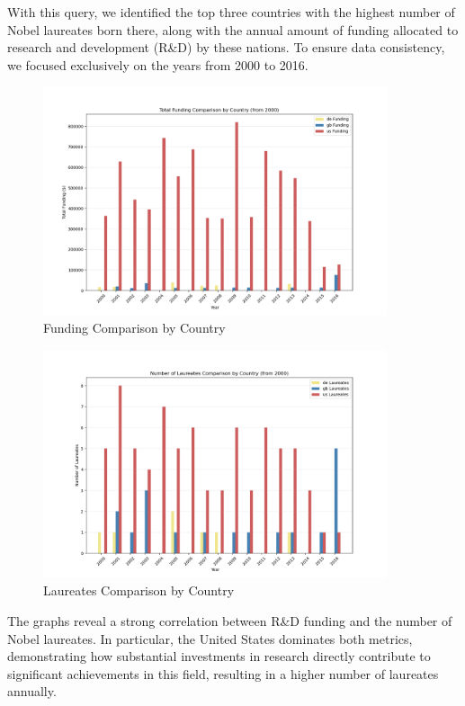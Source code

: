 \documentclass{article}
\begin{document}
\vspace{1em}

With this query, we identified the top three countries with the highest number of Nobel laureates born there, along with the annual amount of funding allocated to research and development (R\&D) by these nations. To ensure data consistency, we focused exclusively on the years from 2000 to 2016.

\begin{figure}[h!]
	\centering
	\includegraphics[width=0.9\textwidth]{../queries/plots/funding_comparison_by_country.png}
	\caption{Funding Comparison by Country}
\end{figure}

\begin{figure}[h!]
	\centering
	\includegraphics[width=0.9\textwidth]{../queries/plots/laureates_comparison_by_country.png}
	\caption{Laureates Comparison by Country}
\end{figure}

The graphs reveal a strong correlation between R\&D funding and the number of Nobel laureates. In particular, the United States dominates both metrics, demonstrating how substantial investments in research directly contribute to significant achievements in this field, resulting in a higher number of laureates annually.
\end{document}
